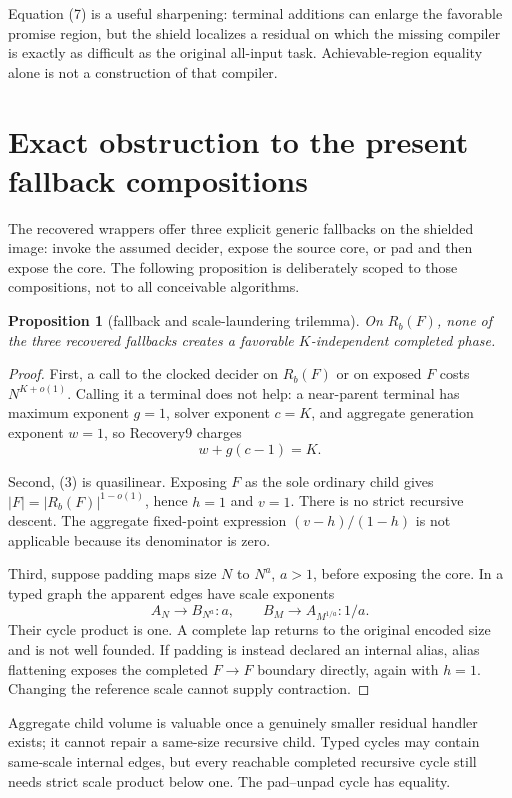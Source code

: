 \documentclass[11pt]{article}
\newtheorem{proposition}[theorem]{Proposition}
\begin{document}
Equation (7) is a useful sharpening: terminal additions can enlarge the
favorable promise region, but the shield localizes a residual on which the
missing compiler is exactly as difficult as the original all-input task.
Achievable-region equality alone is not a construction of that compiler.

\section{Exact obstruction to the present fallback compositions}

The recovered wrappers offer three explicit generic fallbacks on the
shielded image: invoke the assumed decider, expose the source core, or pad and
then expose the core.  The following proposition is deliberately scoped to
those compositions, not to all conceivable algorithms.

\begin{proposition}[fallback and scale-laundering trilemma]
On $R_b(F)$, none of the three recovered fallbacks creates a favorable
$K$-independent completed phase.
\end{proposition}
\begin{proof}
First, a call to the clocked decider on $R_b(F)$ or on exposed $F$ costs
$N^{K+o(1)}$.  Calling it a terminal does not help: a near-parent terminal
has maximum exponent $g=1$, solver exponent $c=K$, and aggregate generation
exponent $w=1$, so Recovery9 charges
\[
 w+g(c-1)=K.                                         \tag{8}
\]

Second, (3) is quasilinear.  Exposing $F$ as the sole ordinary child gives
$|F|=|R_b(F)|^{1-o(1)}$, hence $h=1$ and $v=1$.  There is no strict recursive
descent.  The aggregate fixed-point expression
$(v-h)/(1-h)$ is not applicable because its denominator is zero.

Third, suppose padding maps size $N$ to $N^a$, $a>1$, before exposing the
core.  In a typed graph the apparent edges have scale exponents
\[
 A_N\longrightarrow B_{N^a}:a,
 \qquad B_M\longrightarrow A_{M^{1/a}}:1/a.
\]
Their cycle product is one.  A complete lap returns to the original encoded
size and is not well founded.  If padding is instead declared an internal
alias, alias flattening exposes the completed $F\to F$ boundary directly,
again with $h=1$.  Changing the reference scale cannot supply contraction.
\end{proof}

Aggregate child volume is valuable once a genuinely smaller residual handler
exists; it cannot repair a same-size recursive child.  Typed cycles may
contain same-scale internal edges, but every reachable completed recursive
cycle still needs strict scale product below one.  The pad--unpad cycle has
equality.
\end{document}
